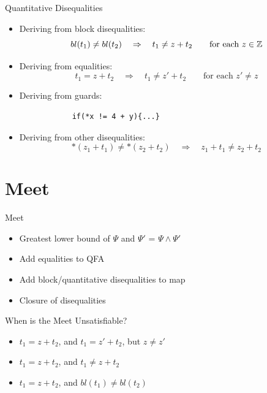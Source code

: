 \documentclass[aspectratio=169]{beamer}
\begin{document}
\begin{frame}{Quantitative Disequalities}
    \begin{itemize}
        \item Deriving from block disequalities:
              \[
                bl(t_1) \neq bl(t_2) \quad\Rightarrow\quad  t_1\neq z+ t_2 \quad\quad \text{for each $z \in \mathbb{Z}$}
              \]
              \pause
        \item Deriving from equalities:
              \[
               t_1 = z + t_2  \quad\Rightarrow\quad t_1\neq z' + t_2 \quad\quad \text{for each $z' \neq z$}
              \]
\pause
        \item Deriving from guards:
              \begin{verbatim}
            if(*x != 4 + y){...}
\end{verbatim}
\pause
        \item Deriving from other disequalities:
              \[ *(z_1 + t_1) \neq *(z_2 + t_2) \quad\Rightarrow\quad z_1 + t_1 \neq z_2 + t_2
              \]
    \end{itemize}
\end{frame}

\section{Meet}
\begin{frame}{Meet}
    \begin{itemize}

        \item Greatest lower bound of $\Psi$ and $\Psi'$ = $\Psi \land \Psi'$
        \pause
        \item Add equalities to QFA
        \pause
        \item Add block/quantitative disequalities to map
        \pause
        \item Closure of disequalities
    \end{itemize}
\end{frame}

\begin{frame}{When is the Meet Unsatisfiable?}
    \begin{itemize}
\pause
        \item $t_1 = z + t_2$, and $t_1 = z' + t_2$, but $z\neq z'$
        \pause
     \item $t_1 = z + t_2$, and $t_1 \neq z + t_2$
     \pause
     \item $t_1 = z + t_2$, and $bl(t_1) \neq bl(t_2)$


    \end{itemize}
\end{frame}
\end{document}
